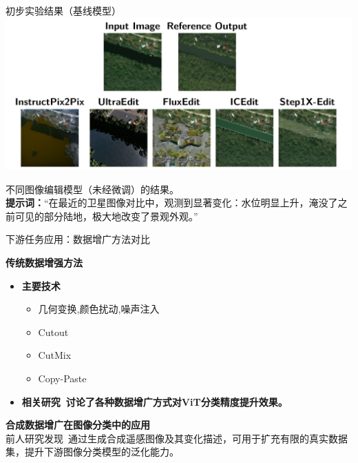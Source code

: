 \documentclass[11pt,aspectratio=169]{beamer}
\begin{document}
\begin{frame}{初步实验结果（基线模型）}
    \centering
    \includegraphics[width=0.95\linewidth]{imagens/baseline_results.png}
    
    {\tiny
    不同图像编辑模型（未经微调）的结果。\\
    \textbf{提示词：}“在最近的卫星图像对比中，观测到显著变化：水位明显上升，淹没了之前可见的部分陆地，极大地改变了景观外观。”
    }
\end{frame}

\begin{frame}{下游任务应用：数据增广方法对比}

    \textbf{传统数据增强方法}
    \begin{itemize}
        \item \textbf{主要技术}
        \begin{itemize}
            \item 几何变换,颜色扰动,噪声注入
            \item Cutout~\cite{devriesImprovedRegularizationConvolutional2017}
            \item CutMix~\cite{yunCutMixRegularizationStrategy2019}
            \item Copy-Paste~\cite{ghiasiSimpleCopyPasteStrong2021}
        \end{itemize}
        \item \textbf{相关研究~\cite{steinerHowTrainYour2022}讨论了各种数据增广方式对ViT分类精度提升效果。}
    \end{itemize}
    \vspace{0.3em}
    
    \textbf{合成数据增广在图像分类中的应用} \\
    前人研究发现~\cite{heSyntheticDataGenerative2022}通过生成合成遥感图像及其变化描述，可用于扩充有限的真实数据集，提升下游图像分类模型的泛化能力。
\end{frame}
\end{document}
